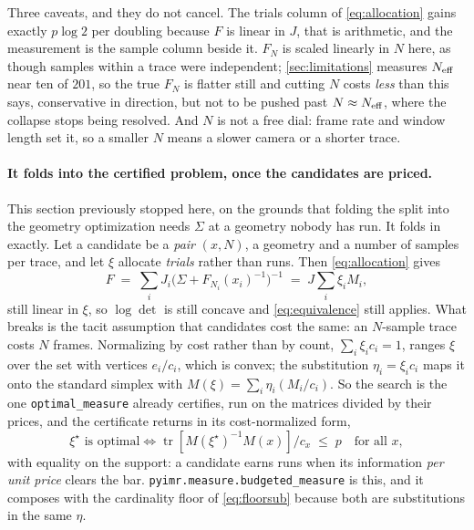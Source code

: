 \documentclass[10pt]{article}
\begin{document}
Three caveats, and they do not cancel. The trials column of \eqref{eq:allocation} gains exactly
$p\log 2$ per doubling because $F$ is linear in $J$, that is arithmetic, and the measurement
is the sample column beside it. $F_N$ is scaled linearly in $N$ here, as though samples within a
trace were independent; \cref{sec:limitations} measures $N_{\rm eff}$ near ten of $201$, so the
true $F_N$ is flatter still and cutting $N$ costs \emph{less} than this says, conservative in
direction, but not to be pushed past $N \approx N_{\rm eff}$, where the collapse stops being
resolved. And $N$ is not a free dial: frame rate and window length set it, so a smaller $N$ means
a slower camera or a shorter trace.

\paragraph{It folds into the certified problem, once the candidates are priced.}
This section previously stopped here, on the grounds that folding the split into the geometry
optimization needs $\Sigma$ at a geometry nobody has run. It folds in exactly. Let a candidate be
a \emph{pair} $(x, N)$, a geometry and a number of samples per trace, and let $\xi$
allocate \emph{trials} rather than runs. Then \eqref{eq:allocation} gives
%
\begin{equation}
F \;=\; \sum_i J_i\big(\Sigma + F_{N_i}(x_i)^{-1}\big)^{-1} \;=\; J\sum_i \xi_i M_i ,
\label{eq:pairedinformation}
\end{equation}
%
still linear in $\xi$, so $\log\det$ is still concave and \cref{eq:equivalence} still applies.
What breaks is the tacit assumption that candidates cost the same: an $N$-sample trace costs $N$
frames. Normalizing by cost rather than by count, $\sum_i \xi_i c_i = 1$, ranges $\xi$ over the
set with vertices $e_i/c_i$, which is convex; the substitution $\eta_i = \xi_i c_i$ maps it onto
the standard simplex with $M(\xi) = \sum_i \eta_i (M_i/c_i)$. So the search is the one
\texttt{optimal\_measure} already certifies, run on the matrices divided by their prices, and the
certificate returns in its cost-normalized form,
%
\begin{equation}
\xi^\star \text{ is optimal} \iff
\operatorname{tr}\!\left[M(\xi^\star)^{-1}M(x)\right]\big/ c_x \;\le\; p \quad\text{for all } x,
\label{eq:costcert}
\end{equation}
%
with equality on the support: a candidate earns runs when its information \emph{per unit price}
clears the bar. \texttt{pyimr.measure.budgeted\_measure} is this, and it composes with the
cardinality floor of \eqref{eq:floorsub} because both are substitutions in the same $\eta$.
\end{document}
